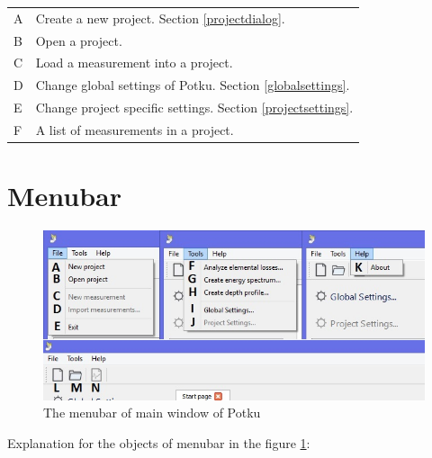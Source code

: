 \documentclass{scrreprt}
\begin{document}
\begin{tabular}{ll}
A & Create a new project. Section \ref{projectdialog}.\\
B & Open a project.\\
C & Load a measurement into a project.\\
D & Change global settings of Potku. Section \ref{globalsettings}.\\
E & Change project specific settings. Section \ref{projectsettings}.\\
F & A list of measurements in a project.\\
\end{tabular}

\section{Menubar}\label{menubar}
\begin{figure}[H]
\centering
\includegraphics[width=140mm]{menubar}
\caption{The menubar of main window of Potku}
\label{fig-menubar}
\end{figure}
Explanation for the objects of menubar in the figure \ref{fig-menubar}:
\end{document}
